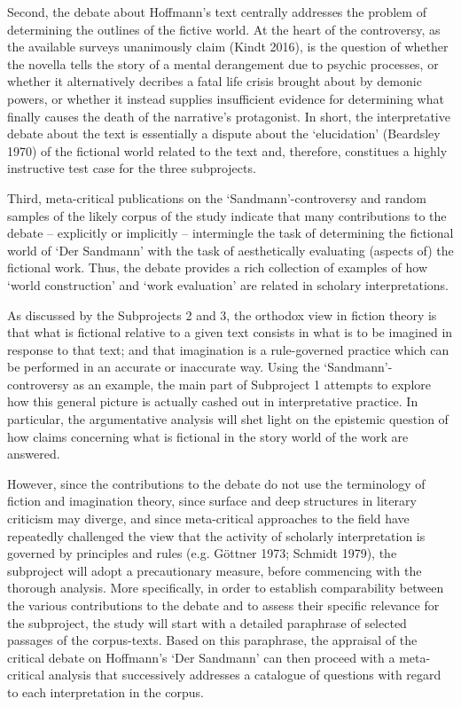 Second, the debate about Hoffmann's text centrally addresses the problem of determining the outlines of the fictive world. At the heart of the controversy, as the available surveys unanimously claim (Kindt 2016), is the question of whether the novella tells the story of a mental derangement due to psychic processes, or whether it alternatively decribes a fatal life crisis brought about by demonic powers, or whether it instead supplies insufficient evidence for determining what finally causes the death of the narrative's protagonist. In short, the interpretative debate about the text is essentially a dispute about the `elucidation' (Beardsley 1970) of the fictional world related to the text and, therefore, constitues a highly instructive test case for the three subprojects. 

Third, meta-critical publications on the `Sandmann'-controversy and random samples of the likely corpus of the study indicate that many contributions to the debate -- explicitly or implicitly -- intermingle the task of determining the fictional world of `Der Sandmann' with the task of aesthetically evaluating (aspects of) the fictional work. Thus, the debate provides a rich collection of examples of how `world construction' and `work evaluation' are related in scholary interpretations.

As discussed by the Subprojects 2 and 3, the orthodox view in fiction theory is that what is fictional relative to a given text consists in what is to be imagined in response to that text; and that imagination is a rule-governed practice which can be performed in an accurate or inaccurate way. Using the `Sandmann'-controversy as an example, the main part of Subproject 1 attempts to explore how this general picture is actually cashed out in interpretative practice. In particular, the argumentative analysis will shet light on the epistemic question of how claims concerning what is fictional in the story world of the work are answered. 

However, since the contributions to the debate do not use the terminology of fiction and imagination theory, since surface and deep structures in literary criticism may diverge, and since meta-critical approaches to the field have repeatedly challenged the view that the activity of scholarly interpretation is governed by principles and rules (e.g. G\"ottner 1973; Schmidt 1979), the subproject will adopt a precautionary measure, before commencing with the thorough analysis. More specifically, in order to establish comparability between the various contributions to the debate and to assess their specific relevance for the subproject, the study will start with a detailed paraphrase of selected passages of the corpus-texts. Based on this paraphrase, the appraisal of the critical debate on Hoffmann's `Der Sandmann' can then proceed with a meta-critical analysis that successively addresses a catalogue of questions with regard to each interpretation in the corpus.

